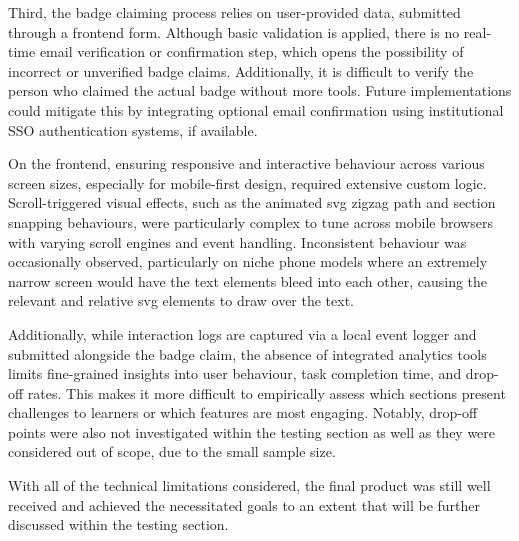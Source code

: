 Third, the badge claiming process relies on user-provided data, submitted through a frontend form. 
Although basic validation is applied, there is no real-time email verification or confirmation step, which opens the possibility of incorrect or unverified badge claims. 
Additionally, it is difficult to verify the person who claimed the actual badge without more tools. Future implementations could mitigate this by integrating optional email confirmation using institutional SSO authentication systems, if available.

On the frontend, ensuring responsive and interactive behaviour across various screen sizes, especially for mobile-first design, required extensive custom logic. 
Scroll-triggered visual effects, such as the animated \acrshort{svg} zigzag path and section snapping behaviours, were particularly complex to tune across mobile browsers with varying scroll engines and event handling. 
Inconsistent behaviour was occasionally observed, particularly on niche phone models where an extremely narrow screen would have the text elements bleed into each other, causing the relevant and relative \acrshort{svg} elements to draw over the text.

Additionally, while interaction logs are captured via a local event logger and submitted alongside the badge claim, the absence of integrated analytics tools limits fine-grained insights into user behaviour, task completion time, and drop-off rates. 
This makes it more difficult to empirically assess which sections present challenges to learners or which features are most engaging. 
Notably, drop-off points were also not investigated within the testing section as well as they were considered out of scope, due to the small sample size.

With all of the technical limitations considered, the final product was still well received and achieved the necessitated goals to an extent that will be further discussed within the testing section.

\newpage